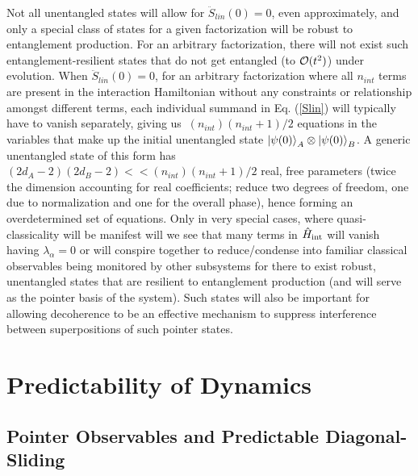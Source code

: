 \documentclass[aps,pra,onecolumn,nofootinbib,11pt,tightenlines]{revtex4-1}
\begin{document}
 Not all unentangled states will allow for $\ddot{S}_{lin}(0) = 0$, even approximately, and only a special class of states for a given factorization will be robust to entanglement production. For an arbitrary factorization, there will not exist such entanglement-resilient states that do not get entangled (to $\mathcal{O}(t^2)$) under evolution. When $\ddot{S}_{lin}(0) = 0$, for an arbitrary factorization where all $n_{int}$ terms are present in the interaction Hamiltonian without any constraints or relationship amongst different terms, each individual summand in Eq. (\ref{Slin}) will typically have to vanish separately, giving us $~ (n_{int})(n_{int} + 1)/2$ equations in the variables that make up the initial unentangled state $\ket{\psi(0)}_{A} \otimes \ket{\psi(0)}_{B}$. A generic unentangled state of this form has $(2d_{A} - 2)(2d_{B} -2) << (n_{int})(n_{int} + 1)/2$ real, free parameters (twice the dimension accounting for real coefficients; reduce two degrees of freedom, one due to normalization and one for the overall phase), hence forming an overdetermined set of equations. Only in very special cases, where quasi-classicality will be manifest will we see that many terms in $\hat{H}_{\rm{int}}$ will vanish having $\lambda_{\alpha} = 0$ or will conspire together to reduce/condense into familiar classical observables being monitored by other subsystems for there to exist robust, unentangled states that are resilient to entanglement production (and will serve as the pointer basis of the system). Such states will also be important for allowing decoherence to be an effective mechanism to suppress interference between superpositions of such pointer states. 


\section{Predictability of Dynamics}
\label{sec:predictability}

\subsection{Pointer Observables and Predictable Diagonal-Sliding}
\label{sec:pointer}
\end{document}
